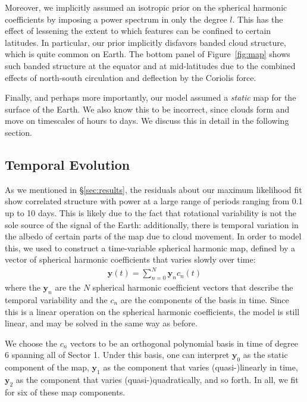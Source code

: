 \documentclass[modern]{aastex62}
\begin{document}
Moreover, we implicitly assumed an isotropic prior on the spherical harmonic
coefficients by imposing a power spectrum in only the degree $l$. This has the
effect of lessening the extent to which features can be confined to certain
latitudes. In particular, our prior implicitly disfavors banded cloud structure,
which is quite common on Earth. The bottom panel of Figure~\ref{fig:map} shows such banded structure
at the equator and at mid-latitudes due to the combined effects of 
north-south circulation and deflection by the Coriolis force.

Finally, and perhaps more importantly, our model assumed a \emph{static}
map for the surface of the Earth. We also know this to be incorrect, since
clouds form and move on timescales of hours to days. We discuss this in
detail in the following section.

\subsection{Temporal Evolution}
\label{sec:temporal}

As we mentioned in \S\ref{sec:results}, the residuals about our maximum
likelihood fit show correlated structure with power at a large range
of periods ranging from 0.1 up to 10 days. This is likely due to 
the fact that rotational variability is not the sole source of the
signal of the Earth: additionally, there is temporal variation in the 
albedo of certain parts of the map  due to cloud movement.
In order to model this, we used \starry to construct a time-variable
spherical harmonic map, defined by a vector of spherical harmonic coefficients
that varies slowly over time:
%
\begin{align}
    \mathbf{y}(t) = \sum_{n=0}^N \mathbf{y}_n c_n(t)
\end{align}
%
where the $\mathbf{y}_n$ are the $N$ spherical harmonic coefficient
vectors that describe the temporal variability and the $c_n$ are the components
of the basis in time. Since this is a linear operation on the spherical
harmonic coefficients, the \starry model is still linear, and may be
solved in the same way as before. 

We choose the $c_n$ vectors to be an orthogonal polynomial basis in time of 
degree 6 spanning all of Sector 1. Under this basis, one can 
interpret
$\mathbf{y}_0$ as the static component of the map, $\mathbf{y}_1$ as the
component that varies (quasi-)linearly in time, $\mathbf{y}_2$ as the component
that varies (quasi-)quadratically, and so forth. In all, we fit for six
of these map components.
\end{document}
